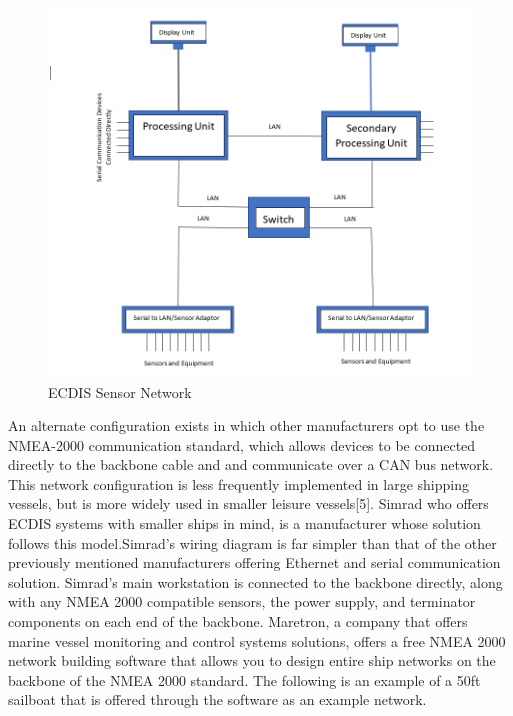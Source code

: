 \documentclass{article}
\begin{document}
\begin{figure}[h]
    \centering
    \includegraphics[width=12cm]{Images and Figures/ECDISsensorNetwork.PNG}
    \caption{ECDIS Sensor Network}
    \label{fig:network}
\end{figure}

An alternate configuration exists in which other manufacturers opt to use the NMEA-2000 communication standard, which allows devices to be connected directly to the backbone cable and and communicate over a CAN bus network. This network configuration is less frequently implemented in large shipping vessels, but is more widely used in smaller leisure vessels[5]. Simrad who offers ECDIS systems with smaller ships in mind, is a manufacturer whose solution follows this model.Simrad's wiring diagram is far simpler than that of the other previously mentioned manufacturers offering Ethernet and serial communication solution. Simrad's main workstation is connected to the backbone directly, along with any NMEA 2000 compatible sensors, the power supply, and terminator components on each end of the backbone. Maretron, a company that offers marine vessel monitoring and control systems solutions, offers a free NMEA 2000 network building software that allows you to design entire ship networks on the backbone of the NMEA 2000 standard. The following is an example of a 50ft sailboat that is offered through the software as an example network.
\end{document}
